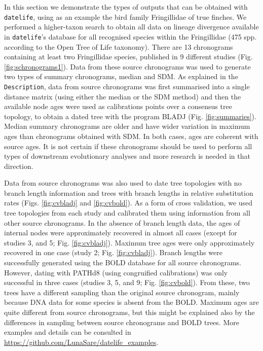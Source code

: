 \documentclass[]{article}
\begin{document}
In this section we demonstrate the types of outputs that can be obtained with \texttt{datelife}, using as an example the bird family Fringillidae of true finches. We performed a higher-taxon search to obtain all data on lineage divergence available in \texttt{datelife}'s database for all recognised species within the Fringillidae (475 spp. according to the Open Tree of Life taxonomy). There are 13 chronograms containing at least two Fringillidae species, published in 9 different studies (Fig. \ref{fig:schronograms1}).
Data from these source chronograms was used to generate two types of summary chronograms, median and SDM. As explained in the \texttt{Description}, data from source chronograms was first summarised into a single distance matrix (using either the median or the SDM method) and then the available node ages were used as calibrations points over a consensus tree topology, to obtain a dated tree with the program BLADJ (Fig. \ref{fig:summaries}). Median summary chronograms are older and have wider variation in maximum ages than chronograms obtained with SDM. In both cases, ages are coherent with source ages.
It is not certain if these chronograms should be used to perform all types of downstream evolutionary analyses and more research is needed in that direction.

Data from source chronograms was also used to date tree topologies with no branch length information and trees with branch lengths in relative substitution rates (Figs. \ref{fig:cvbladj} and \ref{fig:cvbold}). As a form of cross validation, we used tree topologies from each study and calibrated them using information from all other source chronograms. In the absence of branch length data, the ages of internal nodes were approximately recovered in almost all cases (except for studies 3, and 5; Fig. \ref{fig:cvbladj}). Maximum tree ages were only approximately recovered in one case (study 2; Fig. \ref{fig:cvbladj}).
Branch lengths were successfully generated using the BOLD database for all source chronograms. However, dating with PATHd8 (using congruified calibrations) was only successful in
three cases (studies 3, 5, and 9; Fig. \ref{fig:cvbold}). From these, two trees have a different sampling than the original source chronogram, mainly because DNA data for some species is absent from the BOLD. Maximum ages are quite different from source chronograms, but this might be explained also by the differences in sampling between source chronograms and BOLD trees.
More examples and details can be consulted in \url{https://github.com/LunaSare/datelife_examples}.
\end{document}
